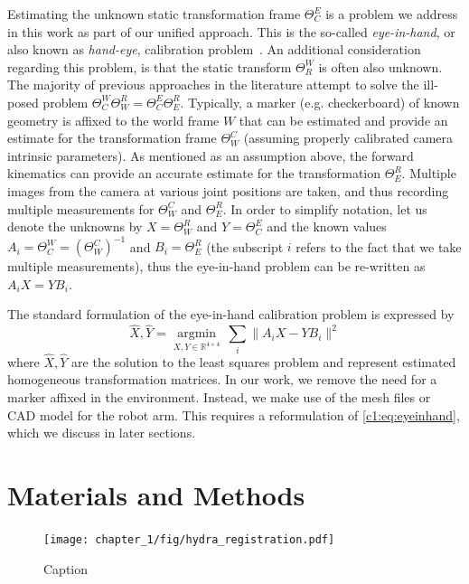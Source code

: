 Estimating the unknown static transformation frame $\Theta^E_C$ is a problem we address in this work as part of our unified approach.
This is the so-called \textit{eye-in-hand}, or also known as \textit{hand-eye}, calibration problem~\cite{Horaud95}.
An additional consideration regarding this problem, is that the static transform $\Theta^W_R$ is often also unknown.
The majority of previous approaches in the literature attempt to solve the ill-posed problem $\Theta^W_C \Theta^R_W = \Theta^E_C \Theta^R_E$.
Typically, a marker (e.g. checkerboard) of known geometry is affixed to the world frame $W$ that can be estimated and provide an estimate for the transformation frame $\Theta^C_W$ (assuming properly calibrated camera intrinsic parameters).
As mentioned as an assumption above, the forward kinematics can provide an accurate estimate for the transformation $\Theta^R_E$.
Multiple images from the camera at various joint positions are taken, and thus recording multiple measurements for $\Theta^C_W$ and $\Theta^R_E$.
In order to simplify notation, let us denote the unknowns by $X=\Theta^R_W$ and $Y=\Theta^E_C$ and the known values $A_i=\Theta^W_C = (\Theta^C_W)^{-1}$ and $B_i=\Theta^R_E$ (the subscript $i$ refers to the fact that we take multiple measurements), thus the eye-in-hand problem can be re-written as $A_i X = Y B_i$.

The standard formulation of the eye-in-hand calibration problem is expressed by
\begin{equation}
\label{c1:eq:eyeinhand}
    \widehat{X}, \widehat{Y} = \underset{X, Y\in\mathbb{R}^{4\times 4}}{\text{arg}\min}~\sum_i \| A_i X - Y B_i\|^2
\end{equation}
where $\widehat{X}, \widehat{Y}$ are the solution to the least squares problem and represent estimated homogeneous transformation matrices.
In our work, we remove the need for a marker affixed in the environment.
Instead, we make use of the mesh files or CAD model for the robot arm.
This requires a reformulation of \eqref{c1:eq:eyeinhand}, which we discuss in later sections.

\section{Materials and Methods}
\label{c1:sec:materials_and_methods}


\begin{figure}
    \centering
    \texttt{[image: chapter\_1/fig/hydra\_registration.pdf]}
    \caption{Caption}
    \label{c1:fig:hydra_registration}
\end{figure}

